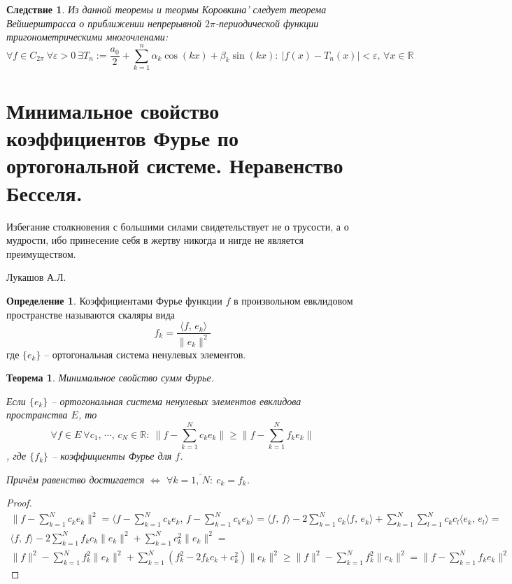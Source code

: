 \documentclass[a4paper,12pt]{article}
\renewcommand{\geq}{\ensuremath{\geqslant}}
\theoremstyle{plain}
\newtheorem{theorem}{Теорема}[section]
\newtheorem*{corollary}{Следствие}
\theoremstyle{definition}
\newtheorem{definition}{Определение}[section]
\theoremstyle{remark}
\begin{document}
\begin{corollary}
	Из данной теоремы и теормы Коровкина' следует теорема Вейшерштрасса о приближении непрерывной $2\pi$-периодической функции тригонометрическими многочленами:
	\[\forall f \in C_{2\pi} \: \forall \varepsilon > 0 \: \exists T_n := \frac{a_0}{2} + \sum_{k = 1}^n \alpha_k\cos(kx) + \beta_k\sin(kx) :\: |f(x) - T_n(x)| < \varepsilon,\, \forall x \in \mathbb{R}\]
\end{corollary}

\section{Минимальное свойство коэффициентов Фурье по ортогональной системе. Неравенство Бесселя.}

\epigraph{Избегание столкновения с большими силами свидетельствует не о трусости, а о мудрости, ибо принесение себя в жертву никогда и нигде не является преимуществом.}{Лукашов А.Л.}

\begin{definition}
	Коэффициентами Фурье функции $f$ в произвольном евклидовом пространстве называются скаляры вида
	\[f_k = \frac{\langle f,\,e_k\rangle}{\|e_k\|^2}\]
	где $\{e_k\}$ -- ортогональная система ненулевых элементов.
\end{definition}

\begin{theorem}
	Минимальное свойство сумм Фурье.

	Если $\{e_k\}$ -- ортогональная система ненулевых элементов евклидова пространства $E$, то
	\[\forall f \in E \: \forall c_1,\,\cdots,\,c_N \in \mathbb{R}:\: \|f - \sum_{k = 1}^N c_ke_k\| \geq \|f - \sum_{k = 1}^N f_ke_k\|\], где $\{f_k\}$ -- коэффициенты Фурье для $f$.

	Причём равенство достигается $\Leftrightarrow$ $\forall k = \overline{1,\,N}:\: c_k = f_k$.
\end{theorem}
\begin{proof}
	\begin{align*}
		\|f - \sum_{k=1}^N c_ke_k\|^2 = \langle f - \sum_{k = 1}^N c_ke_k,\, f - \sum_{k = 1}^N c_ke_k\rangle = \langle f,\,f\rangle - 2\sum_{k = 1}^Nc_k \langle f,\, e_k\rangle + \sum_{k = 1}^N\sum_{l = 1}^N c_kc_l \langle e_k,\, e_l \rangle = \\
		\langle f,\, f\rangle - 2\sum_{k = 1}^N f_kc_k \|e_k\|^2 + \sum_{k = 1}^Nc_k^2\|e_k\|^2 =                                                                                                                                                    \\
		\|f\|^2 - \sum_{k = 1}^N f_k^2\|e_k\|^2 + \sum_{k = 1}^N (f_k^2 - 2f_kc_k + c_k^2)\|e_k\|^2 \geq \|f\|^2 - \sum_{k = 1}^Nf_k^2\|e_k\|^2 = \|f - \sum_{k = 1}^N f_ke_k\|^2
	\end{align*}
\end{proof}
\end{document}
